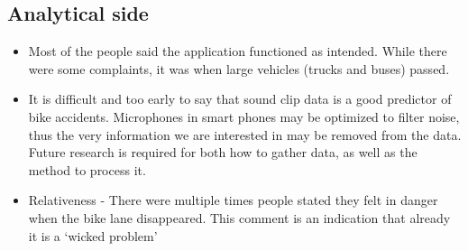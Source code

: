 \subsection{Analytical side}
\begin{itemize}
  \item Most of the people said the application functioned as intended. While there were some complaints, it was  when large vehicles (trucks and buses) passed. 
  \item {}
  It is difficult and too early to say that sound clip data is a good  predictor  of  bike  accidents.  Microphones in smart phones may be optimized to filter noise, thus the very information we are interested in may be removed from the data. Future research is required for both how to gather data, as well as the method to process it.
  \item Relativeness - There were multiple times people stated they felt in danger when the bike lane disappeared.  This comment is an indication that already it is a `wicked problem'
\end{itemize}

